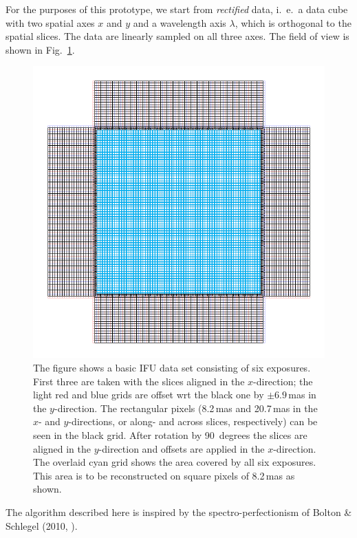 For the purposes of this prototype, we start from \emph{rectified} data,
i.~e.~a data cube with two spatial axes $x$ and $y$ and a wavelength axis $\lambda$,
which is orthogonal to the spatial slices. The data are linearly sampled on all three axes.
The field of view is shown in Fig.~\ref{fig:op_concept}.

\begin{figure}
    \centering
    \includegraphics{op_concept.pdf}
    \caption[Overlaid model and data pixel grids]{The figure shows a basic IFU data set consisting of six
        exposures. First three are taken with the slices aligned in the
        $x$-direction; the light red and blue grids are offset wrt the black
        one by $\pm 6.9\,$mas in the $y$-direction. The rectangular pixels
        (8.2\,mas and 20.7\,mas in the $x$- and $y$-directions, or along- and
        across slices, respectively) can be seen in the black grid. After
        rotation by 90~degrees the slices are aligned in the $y$-direction
        and offsets are applied in the $x$-direction.  The overlaid cyan
        grid shows the area covered by all six exposures. This area is to
        be reconstructed on square pixels of 8.2\,mas as shown.
    }
    \label{fig:op_concept}
\end{figure}

The algorithm described here is inspired by the spectro-perfectionism of Bolton \& Schlegel (2010, \cite{bs10}).

